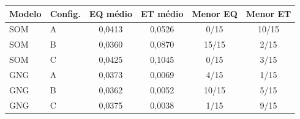\begin{tabular}{llcccc}
\toprule
Modelo & Config. & EQ médio & ET médio & Menor EQ & Menor ET \\
\midrule
SOM & A & 0{,}0413 & 0{,}0526 & 0/15 & 10/15 \\
SOM & B & 0{,}0360 & 0{,}0870 & 15/15 & 2/15 \\
SOM & C & 0{,}0425 & 0{,}1045 & 0/15 & 3/15 \\
\midrule
GNG & A & 0{,}0373 & 0{,}0069 & 4/15 & 1/15 \\
GNG & B & 0{,}0362 & 0{,}0052 & 10/15 & 5/15 \\
GNG & C & 0{,}0375 & 0{,}0038 & 1/15 & 9/15 \\
\bottomrule
\end{tabular}
